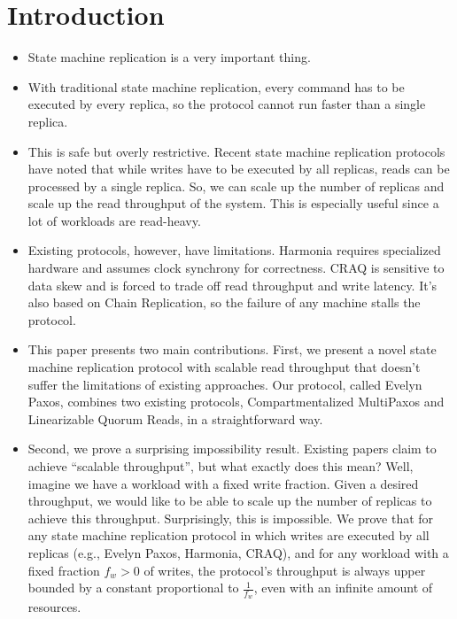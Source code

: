 \section{Introduction}

\begin{itemize}
  \item
    State machine replication is a very important thing.

  \item
    With traditional state machine replication, every command has to be
    executed by every replica, so the protocol cannot run faster than a single
    replica.

  \item
    This is safe but overly restrictive. Recent state machine replication
    protocols have noted that while writes have to be executed by all replicas,
    reads can be processed by a single replica. So, we can scale up the number
    of replicas and scale up the read throughput of the system. This is
    especially useful since a lot of workloads are read-heavy.

  \item
    Existing protocols, however, have limitations. Harmonia requires
    specialized hardware and assumes clock synchrony for correctness. CRAQ is
    sensitive to data skew and is forced to trade off read throughput and write
    latency. It's also based on Chain Replication, so the failure of any
    machine stalls the protocol.

  \item
    This paper presents two main contributions. First, we present a novel state
    machine replication protocol with scalable read throughput that doesn't
    suffer the limitations of existing approaches. Our protocol, called Evelyn
    Paxos, combines two existing protocols, Compartmentalized MultiPaxos and
    Linearizable Quorum Reads, in a straightforward way.

  \item
    Second, we prove a surprising impossibility result. Existing papers claim
    to achieve ``scalable throughput'', but what exactly does this mean? Well,
    imagine we have a workload with a fixed write fraction. Given a desired
    throughput, we would like to be able to scale up the number of replicas to
    achieve this throughput. Surprisingly, this is impossible. We prove that
    for any state machine replication protocol in which writes are executed by
    all replicas (e.g., Evelyn Paxos, Harmonia, CRAQ), and for any workload
    with a fixed fraction $f_w > 0$ of writes, the protocol's throughput is
    always upper bounded by a constant proportional to $\frac{1}{f_w}$, even
    with an infinite amount of resources.
\end{itemize}
